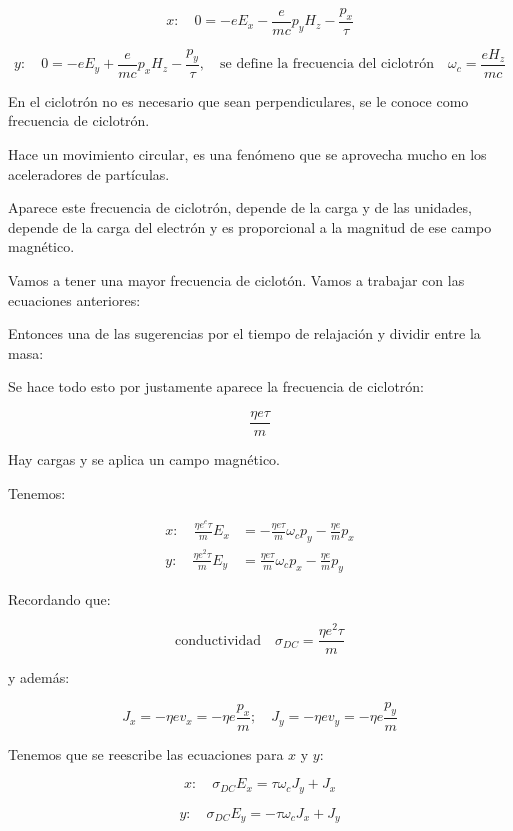 \documentclass{article}
\begin{document}
\[ x: \quad 0 = -eE_{x}-\frac{e}{mc}p_{y}H_{z}-\frac{p_{x}}{\tau} \]


\[ y: \quad 0 = -eE_{y}+\frac{e}{mc}p_{x}H_{z}-\frac{p_{y}}{\tau}, \quad \text{se define la frecuencia del ciclotrón} \quad \boxed{\omega_{c} = \frac{eH_{z}}{mc}} \]


En el ciclotrón no es necesario que sean perpendiculares, se le conoce como frecuencia de ciclotrón.


Hace un movimiento circular, es una fenómeno que se aprovecha mucho en los aceleradores de partículas. 

Aparece este frecuencia de ciclotrón, depende de la carga y de las unidades, depende de la carga del electrón y es proporcional a la magnitud de ese campo magnético.

Vamos a tener una mayor frecuencia de ciclotón. Vamos a trabajar con las ecuaciones anteriores:


Entonces una de las sugerencias por el tiempo de relajación y dividir entre la masa:

Se hace todo esto por justamente aparece la frecuencia de ciclotrón:

\[ \frac{\eta e\tau}{m} \]

Hay cargas y se aplica un campo magnético. 

Tenemos:


\begin{equation}
\begin{split}
 x:  \quad \frac{\eta e^{e}\tau}{m}E_{x} &= - \frac{\eta e\tau}{m}\omega_{c}p_{y} - \frac{\eta e}{m}p_{x}\\
 y: \quad \frac{\eta e^{2}\tau}{m}E_{y} &= \frac{\eta e \tau}{m}\omega_{c}p_{x}-\frac{\eta e}{m}p_{y}
\end{split}
\end{equation}

Recordando que:

\[ \text{conductividad} \quad \sigma_{DC} = \frac{ \eta e^{2}\tau }{m}  \]


y además:



\[  J_{x} = -\eta ev_{x} = - \eta e \frac{p_{x}}{m}; \quad J_{y} = -\eta ev_{y} = -\eta e\frac{p_{y}}{m} \]


Tenemos que se reescribe las ecuaciones para $x$ y $y$:


\[ x: \quad \sigma_{DC} E_{x} = \tau \omega_{c}J_{y}+J_{x} \]

\[y: \quad \sigma_{DC}E_{y} = -\tau \omega_{c}J_{x}+J_{y}\]
\end{document}
